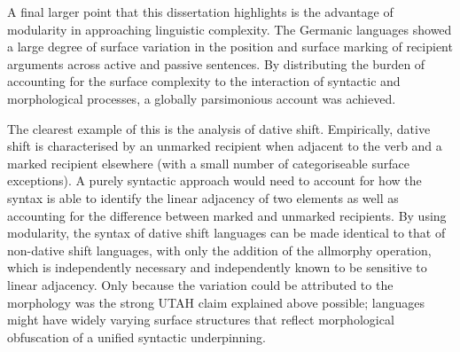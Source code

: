 A final larger point that this dissertation highlights is the advantage of modularity in approaching linguistic complexity. The Germanic languages showed a large degree of surface variation in the position and surface marking of recipient arguments across active and passive sentences. By distributing the burden of accounting for the surface complexity to the interaction of syntactic and morphological processes, a globally parsimonious account was achieved.

The clearest example of this is the analysis of dative shift. Empirically, dative shift is characterised by an unmarked recipient when adjacent to the verb and a marked recipient elsewhere (with a small number of categoriseable surface exceptions). A purely syntactic approach would need to account for how the syntax is able to identify the linear adjacency of two elements as well as accounting for the difference between marked and unmarked recipients. By using modularity, the syntax of dative shift languages can be made identical to that of non-dative shift languages, with only the addition of the allmorphy operation, which is independently necessary and independently known to be sensitive to linear adjacency. Only because the variation could be attributed to the morphology was the strong UTAH claim explained above possible; languages might have widely varying surface structures that reflect morphological obfuscation of a unified syntactic underpinning.

%
